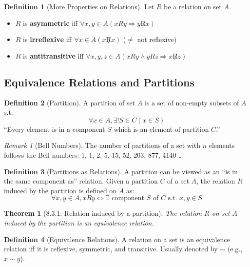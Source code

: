 \documentclass{article}
\theoremstyle{plain}
\newtheorem{theorem}{Theorem}[section]
\theoremstyle{definition}
\newtheorem*{definition}{Definition}
\theoremstyle{remark}
\newtheorem*{remark}{Remark}
\begin{document}
\begin{definition}[More Properties on Relations]
    Let $R$ be a relation on set $A$.
    \begin{itemize}
        \item $R$ is \textbf{asymmetric} iff $\forall x, y \in A (xRy \Rightarrow y \not R x)$
        \item $R$ is \textbf{irreflexive} iff $\forall x \in A (x \not R x)$ ($\neq$ not reflexive)
        \item $R$ is \textbf{antitransitive} iff $\forall x, y, z \in A (xRy \wedge yRz \Rightarrow x \not R z)$
    \end{itemize}
\end{definition}

\subsection{Equivalence Relations and Partitions}

\begin{definition}[Partition]
    A partition of set $A$ is a set of non-empty subsets of $A$ s.t.
    \[ \forall x \in A, \exists! S \in C (x \in S) \]
    ``Every element is in a component $S$ which is an element of partition $C$.''
\end{definition}

\begin{remark}[Bell Numbers]
    The number of partitions of a set with $n$ elements follows the Bell numbers: 1, 1, 2, 5, 15, 52, 203, 877, 4140 \dots
\end{remark}

\begin{definition}[Partitions as Relations]
    A partition can be viewed as an ``is in the same component as'' relation. 
    Given a partition $C$ of a set $A$, the relation $R$ induced by the partition is defined on $A$ as:
    \[ \forall x, y \in A, xRy \Leftrightarrow \exists \text{ component } S \text{ of } C \text{ s.t. } x, y \in S \]
\end{definition}

\begin{theorem}[8.3.1: Relation induced by a partition]
    The relation $R$ on set $A$ induced by the partition is an equivalence relation.
\end{theorem}

\begin{definition}[Equivalence Relations]
    A relation on a set is an equivalence relation iff it is reflexive, symmetric, and transitive. Usually denoted by $\sim$ (e.g., $x \sim y$).
\end{definition}
\end{document}

